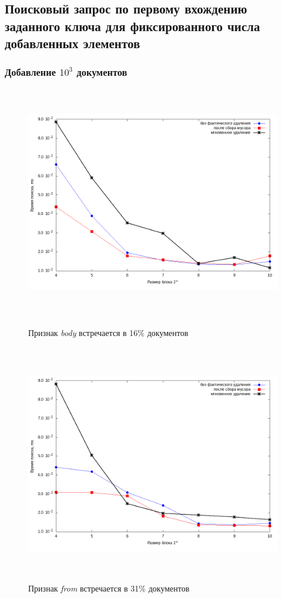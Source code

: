 \subsection{Поисковый запрос по первому вхождению заданного ключа для фиксированного числа добавленных элементов}

\subsubsection{Добавление $10^3$ документов}

\begin{figure}[H]
\includegraphics[width=\linewidth, height=10.25cm]{fig/limit_1/1e3/body.png}
\caption{Признак \textit{body} встречается в 16\% документов}
\includegraphics[width=\linewidth, height=10.5cm]{fig/limit_1/1e3/from.png}
\caption{Признак \textit{from} встречается в 31\% документов}
\end{figure}


